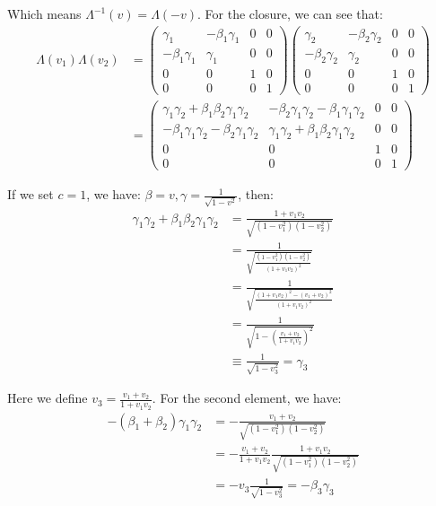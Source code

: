 \documentclass[]{ctexart}
\begin{document}
			Which means $\Lambda^{-1}(v)=\Lambda(-v)$. For the closure, we can see that:
				\begin{equation*}
				\begin{aligned}
					\Lambda(v_1)\Lambda(v_2)&=
					\begin{pmatrix}
						\gamma_1 & -\beta_1 \gamma_1 & 0 & 0\\
						-\beta_1 \gamma_1 & \gamma_1 & 0 & 0\\
						0 & 0 & 1 & 0\\
						0 & 0 & 0 & 1
					\end{pmatrix}
					\begin{pmatrix}
						\gamma_2 & -\beta_2 \gamma_2 & 0 & 0\\
						-\beta_2 \gamma_2 & \gamma_2 & 0 & 0\\
						0 & 0 & 1 & 0\\
						0 & 0 & 0 & 1
					\end{pmatrix}\\
					&=
					\begin{pmatrix}
						\gamma_1\gamma_2+\beta_1\beta_2\gamma_1\gamma_2 & -\beta_2 \gamma_1\gamma_2- \beta_1 \gamma_1\gamma_2& 0 & 0\\
						-\beta_1 \gamma_1\gamma_2-\beta_2 \gamma_1\gamma_2 & \gamma_1\gamma_2+\beta_1\beta_2\gamma_1\gamma_2 & 0 & 0\\
						0 & 0 & 1 & 0\\
						0 & 0 & 0 & 1
					\end{pmatrix}
				\end{aligned}
				\end{equation*}
			
			If we set $c=1$, we have: $\beta=v,\gamma=\frac{1}{\sqrt{1-v^2}}$, then:
				\begin{equation*}
				\begin{aligned}
					\gamma_1\gamma_2+\beta_1\beta_2\gamma_1\gamma_2&=\frac{1+v_1v_2}{\sqrt{(1-v_1^2)(1-v_2^2)}}\\
					&=\frac{1}{\sqrt{\frac{(1-v_1^2)(1-v_2^2)}{(1+v_1v_2)^2}}}\\
					&=\frac{1}{\sqrt{\frac{(1+v_1v_2)^2-(v_1+v_2)^2}{(1+v_1v_2)^2}}}\\
					&=\frac{1}{\sqrt{1-\left(\frac{v_1+v_2}{1+v_1v_2}\right)^2}}\\
					&\equiv \frac{1}{\sqrt{1-v_3^2}}=\gamma_3
				\end{aligned}
				\end{equation*}
			
			Here we define $v_3=\frac{v_1+v_2}{1+v_1v_2}$. For the second element, we have:
				\begin{equation*}
				\begin{aligned}
					-(\beta_1+\beta_2)\gamma_1\gamma_2&=-\frac{v_1+v_2}{\sqrt{(1-v_1^2)(1-v_2^2)}}\\
					&=-\frac{v_1+v_2}{1+v_1v_2}\frac{1+v_1v_2}{\sqrt{(1-v_1^2)(1-v_2^2)}}\\
					&=-v_3\frac{1}{\sqrt{1-v_3^2}}=-\beta_3\gamma_3
				\end{aligned}
				\end{equation*}
			
\end{document}
